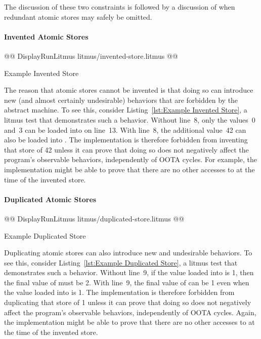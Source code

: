 \documentclass[10]{article}
\begin{document}
The discussion of these two constraints is followed by a discussion of
when redundant atomic stores may safely be omitted.

\paragraph{Invented Atomic Stores}

\begin{listing}[tbp]
@@ DisplayRunLitmus litmus/invented-store.litmus @@
\caption{Example Invented Store}
\label{lst:Example Invented Store}
\end{listing}

The reason that atomic stores cannot be invented is that doing so can
introduce new (and almost certainly undesirable) behaviors that are
forbidden by the abstract machine.
To see this, consider Listing~\ref{lst:Example Invented Store},
a  litmus test that demonstrates such a behavior.
Without line~8, only the values~0 and~3 can be loaded into  on
line~13.
With line~8, the additional value~42 can also be loaded into .
The implementation is therefore forbidden from inventing that store of 42
unless it can prove that doing so does not negatively affect the
program's observable behaviors, independently of OOTA cycles.
For example, the implementation might be able to prove that there
are no other accesses to  at the time of the invented store.

\paragraph{Duplicated Atomic Stores}

\begin{listing}[tbp]
@@ DisplayRunLitmus litmus/duplicated-store.litmus @@
\caption{Example Duplicated Store}
\label{lst:Example Duplicated Store}
\end{listing}

Duplicating atomic stores can also introduce new and undesirable
behaviors.
To see this, consider Listing~\ref{lst:Example Duplicated Store}, a
litmus test that demonstrates such a behavior.
Without line~9, if the value loaded into  is 1, then the final value
of  must be 2.
With line~9, the final value of  can be 1 even when the
value loaded into  is 1.
The implementation is therefore forbidden from duplicating that store of 1
unless it can prove that doing so does not negatively affect the
program's observable behaviors, independently of OOTA cycles.
Again, the implementation might be able to prove that there
are no other accesses to  at the time of the invented store.
\end{document}
